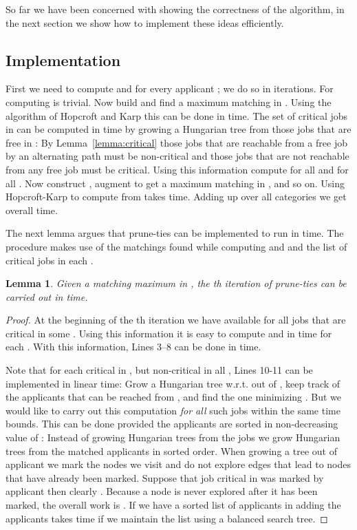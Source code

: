 \documentclass[11pt]{article}
\newcommand{\wrt}{{w.r.t.}\xspace}
\newtheorem{lemma}{Lemma}
\begin{document}
{So far we have been concerned with showing the correctness of the algorithm, in the next section we show how to implement these ideas efficiently.

\subsection{Implementation}

First we need to compute  and  for every applicant ; we do so in iterations. For  computing  is trivial. Now build  and find a maximum matching  in . Using the algorithm of Hopcroft and Karp \cite{HK73} this can be done in  time. The set of critical jobs in  can be computed in  time by growing a Hungarian tree \cite{CombOpt-book} from those jobs that are free in : By Lemma~\ref{lemma:critical} those jobs that are reachable from a free job by an alternating path must be non-critical and those jobs that are not reachable from any free job must be critical. Using this information compute  for all  and  for all . Now construct , augment  to get a maximum matching  in , and so on. Using Hopcroft-Karp to compute  from  takes  time. Adding up over all categories we get overall  time.

The next lemma argues that {\sc prune-ties} can be implemented to run in  time. The procedure makes use of the matchings  found while computing  and  and the list of critical jobs in each .

\begin{lemma} Given a matching  maximum in , the th iteration of {\sc prune-ties} can be carried out in  time.
\end{lemma}

\begin{proof}
At the beginning of the th iteration we have available  for all jobs that are critical in some . Using this information it is easy to compute  and  in  time for each . With this information, Lines 3--8 can be done in  time.

Note that for each  critical in , but non-critical in all , Lines 10-11 can be implemented in linear time: Grow a Hungarian tree \wrt   out of , keep track of the applicants  that can be reached from , and find the one minimizing . But we would like to carry out this computation \emph{for all} such jobs within the same time bounds. This can be done provided the applicants  are sorted in non-decreasing value of : Instead of growing Hungarian trees from the jobs we grow Hungarian trees from the matched applicants in sorted order. When growing a tree out of applicant  we mark the nodes we visit and do not explore edges that lead to nodes that have already been marked. Suppose that job  critical in  was marked by applicant  then clearly . Because a node is never explored after it has been marked, the overall work is . If we have a sorted list of applicants in  adding the applicants  takes  time if we maintain the list using a balanced search tree.
\end{proof}

}
\end{document}
